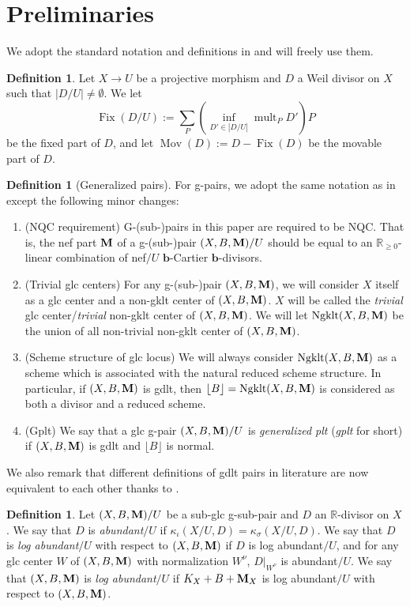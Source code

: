 \documentclass[11pt]{amsart}
\numberwithin{equation}{section}
\newcommand{\bb}{\bm{b}}
\newcommand{\Mm}{{\bf{M}}}
\newcommand{\Rr}{\mathbb{R}}
\newcommand{\Fix}{\operatorname{Fix}}
\newcommand{\Mov}{\operatorname{Mov}}
\newcommand{\Ngklt}{\operatorname{Ngklt}}
\newcommand{\mult}{\operatorname{mult}}
\theoremstyle{definition}
\newtheorem{defn}[thm]{Definition}
\theoremstyle{definition}
\theoremstyle{definition}
\begin{document}
\section{Preliminaries}\label{sec: preliminaries}

We adopt the standard notation and definitions in \cite{KM98,BCHM10}
and will freely use them.

\begin{defn}
  Let $X\rightarrow U$ be a projective morphism and $D$ a Weil
  divisor on $X$ such that $|D/U|\not=\emptyset$. We let
  $$\Fix(D/U):=\sum_P(\inf_{D'\in |D/U|}\mult_PD')P$$ be the fixed
  part of $D$, and let $\Mov(D):=D-\Fix(D)$ be the movable part of $D$.
\end{defn}

\begin{defn}[Generalized pairs]
  For g-pairs, we adopt the same notation as in \cite{HL21a} except
  the following minor changes:
  \begin{enumerate}
    \item (NQC requirement) G-(sub-)pairs in this paper are required
      to be NQC. That is, the nef part $\Mm$ of a g-(sub-)pair
      $(X,B,\Mm)/U$ should be equal to an $\mathbb R_{\geq 0}$-linear
      combination of nef$/U$ $\bb$-Cartier $\bb$-divisors.
    \item (Trivial glc centers) For any g-(sub-)pair $(X,B,\Mm)$, we
      will consider $X$ itself as a glc center and a non-gklt center
      of $(X,B,\Mm)$. $X$ will be called the \emph{trivial} glc
      center/\emph{trivial} non-gklt center of $(X,B,\Mm)$. We will
      let $\Ngklt(X,B,\Mm)$ be the union of all non-trivial non-gklt
      center of $(X,B,\Mm)$.
    \item (Scheme structure of glc locus) We will always consider
      $\Ngklt(X,B,\Mm)$ as a scheme which is associated with the
      natural reduced scheme structure. In particular, if $(X,B,\Mm)$
      is gdlt, then $\lfloor B\rfloor=\Ngklt(X,B,\Mm)$ is considered
      as both a divisor and a reduced scheme.
    \item (Gplt) We say that a glc g-pair $(X,B,\Mm)/U$ is
      \emph{generalized plt} (\emph{gplt} for short) if $(X,B,\Mm)$
      is gdlt and $\lfloor B\rfloor$ is normal.
  \end{enumerate}
  We also remark that different definitions of gdlt pairs in
  literature are now equivalent to each other thanks to \cite[Theorem
  6.1]{Has22}.
\end{defn}

\begin{defn}\label{defn: b log abundance}
  Let $(X,B,\Mm)/U$ be a sub-glc g-sub-pair and $D$ an $\Rr$-divisor
  on $X$. We say that $D$ is \emph{abundant}$/U$ if
  $\kappa_{\iota}(X/U,D)=\kappa_{\sigma}(X/U,D)$. We say that $D$ is
  \emph{log abundant}$/U$ with respect to $(X,B,\Mm)$ if $D$ is log
  abundant$/U$, and for any glc center $W$ of $(X,B,\Mm)$ with
  normalization $W^{\nu}$, $D|_{W^{\nu}}$ is abundant$/U$. We say
  that $(X,B,\Mm)$ is \emph{log abundant}$/U$ if $K_X+B+\Mm_X$ is log
  abundant$/U$ with respect to $(X,B,\Mm)$.
\end{defn}
\end{document}
